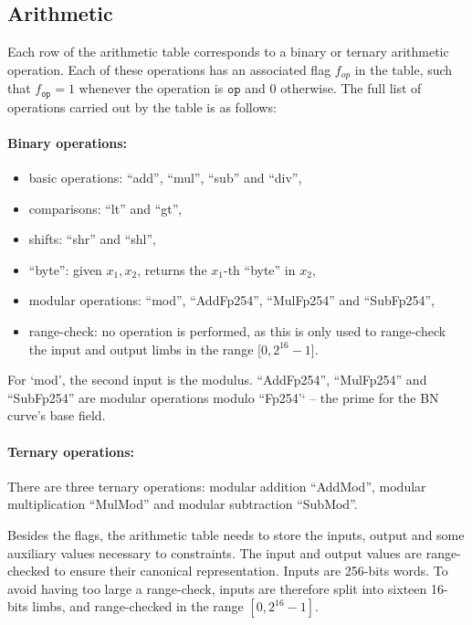 \subsection{Arithmetic}
\label{arithmetic}

Each row of the arithmetic table corresponds to a binary or ternary arithmetic operation. Each of these operations has an associated flag $f_{op}$ in the table, such that $f_{\texttt{op}} = 1$ whenever the operation is $\texttt{op}$ and 0 otherwise. The full list of operations carried out by the table is as follows:
\paragraph*{Binary operations:} \begin{itemize}
        \item basic operations: ``add'', ``mul'', ``sub'' and ``div'',
        \item comparisons: ``lt'' and ``gt'',
        \item shifts: ``shr'' and ``shl'',
        \item ``byte'': given $x_1, x_2$, returns the $x_1$-th ``byte'' in $x_2$,
        \item modular operations: ``mod'', ``AddFp254'', ``MulFp254'' and ``SubFp254'',
        \item range-check: no operation is performed, as this is only used to range-check the input and output limbs in the range [$0, 2^{16} - 1$].
    \end{itemize}
For `mod', the second input is the modulus. ``AddFp254'', ``MulFp254'' and ``SubFp254'' are modular operations modulo ``Fp254'` -- the prime for the BN curve's base field.

\paragraph*{Ternary operations:} There are three ternary operations: modular addition ``AddMod'', modular multiplication ``MulMod'' and modular subtraction ``SubMod''.

Besides the flags, the arithmetic table needs to store the inputs, output and some auxiliary values necessary to constraints. The input and output values are range-checked to ensure their canonical representation. Inputs are 256-bits words. To avoid having too large a range-check, inputs are therefore split into sixteen 16-bits limbs, and range-checked in the range $[0, 2^{16}-1]$.

